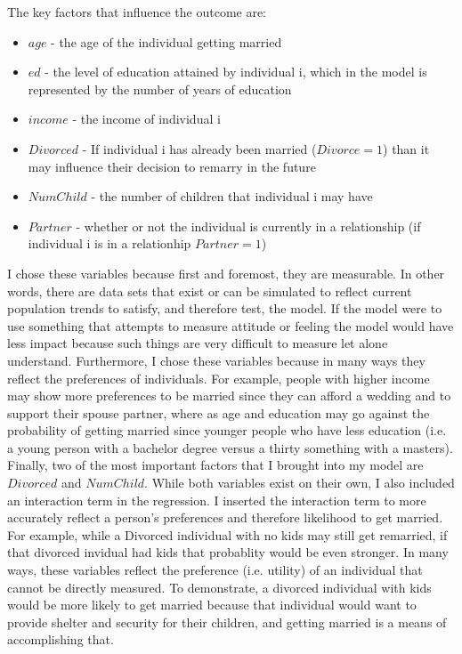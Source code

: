 \documentclass[11pt]{article}
\begin{document}
The key factors that influence the outcome are:
	\begin{itemize}
		\item $age$ - the age of the individual getting married
		\item $ed$ - the level of education attained by individual i, which in the model is represented by the number of years of education
		\item $income$ - the income of individual i
		\item $Divorced$ - If individual i has already been married ($Divorce = 1$) than it may influence their decision to remarry in the future
		\item $NumChild$ - the number of children that individual i may have
		\item $Partner$ - whether or not the individual is currently in a relationship (if individual i is in a relationhip $Partner = 1$)
	\end{itemize}

I chose these variables because first and foremost, they are measurable. In other words, there are data sets that exist or can be simulated to reflect current population trends to satisfy, and therefore test, the model. If the model were to use something that attempts to measure attitude or feeling the model would have less impact because such things are very difficult to measure let alone understand. Furthermore, I chose these variables because in many ways they reflect the preferences of individuals. For example, people with higher income may show more preferences to be married since they can afford a wedding and to support their spouse partner, where as age and education may go against the probability of getting married since younger people who have less education (i.e. a young person with a bachelor degree versus a thirty something with a masters). Finally, two of the most important factors that I brought into my model are $Divorced$ and $NumChild$. While both variables exist on their own, I also included an interaction term in the regression. I inserted the interaction term to more accurately reflect a person's preferences and therefore likelihood to get married. For example, while a Divorced individual with no kids may still get remarried, if that divorced invidual had kids that probablity would be even stronger. In many ways, these variables reflect the preference (i.e. utility) of an individual that cannot be directly measured. To demonstrate, a divorced individual with kids would be more likely to get married because that individual would want to provide shelter and security for their children, and getting married is a means of accomplishing that.\\
\end{document}
